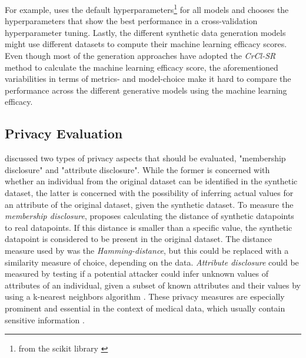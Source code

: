 For example, \cite{kunar2021DTGANDifferentialPrivatea} uses the default hyperparameters\footnote{from the scikit library \cite{scikit-learn}} for all models and 
\cite{kim2021OCTGANNeuralODEbased} chooses the hyperparameters that show the best performance in a cross-validation hyperparameter tuning.
Lastly, the different synthetic data generation models might use different datasets to compute their machine learning efficacy scores.
Even though most of the generation approaches have adopted the \textit{CrCl-SR} \cite{goncalves2020GenerationEvaluationSynthetic} method to calculate the machine learning efficacy score,
the aforementioned variabilities in terms of metrics- and model-choice make it hard to compare the performance across the different generative models using the machine learning efficacy.

\subsection{Privacy Evaluation}
\label{ch:preliminaries-evaluationOfSyntheticTabularData-privacyEvaluation}
\textcite[p. 7f.]{goncalves2020GenerationEvaluationSynthetic} discussed two types of privacy aspects that should be evaluated, "membership disclosure" and "attribute disclosure".
While the former is concerned with whether an individual from the original dataset can be identified in the synthetic dataset, the latter is concerned with the possibility of inferring actual values for an attribute of the original dataset, given the synthetic dataset.
To measure the \textit{membership disclosure}, \cite{goncalves2020GenerationEvaluationSynthetic} proposes calculating the distance of synthetic datapoints to real datapoints.
If this distance is smaller than a specific value, the synthetic datapoint is considered to be present in the original dataset.
The distance measure used by \cite{goncalves2020GenerationEvaluationSynthetic} was the \textit{Hamming-distance}, but this could be replaced with a similarity measure of choice, depending on the data.
\textit{Attribute disclosure} could be measured by testing if a potential attacker could infer unknown values of attributes of an individual, given a subset of known attributes and their values by using a k-nearest neighbors algorithm \cite{goncalves2020GenerationEvaluationSynthetic}.
These privacy measures are especially prominent and essential in the context of medical data, which usually contain sensitive information \cite{goncalves2020GenerationEvaluationSynthetic, choi2017GeneratingMultilabelDiscrete}.

